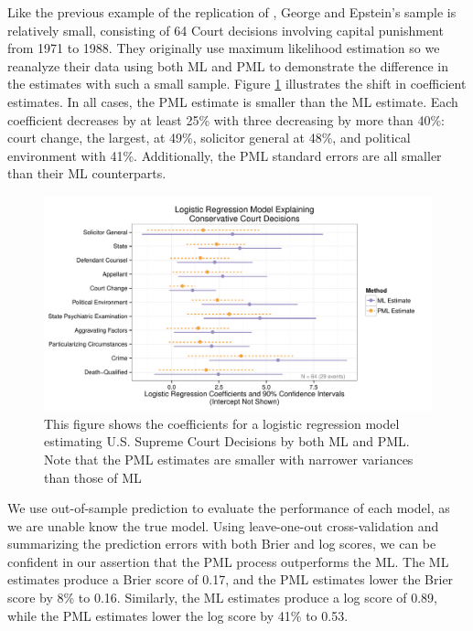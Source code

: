 \documentclass[12pt]{article}
\begin{document}
Like the previous example of the replication of \cite{Weisiger2014}, George and Epstein's sample is relatively small, consisting of 64 Court decisions involving capital punishment from 1971 to 1988. 
They originally use maximum likelihood estimation so we reanalyze their data using both ML and PML to demonstrate the difference in the estimates with such a small sample. 
Figure \ref{fig:ge-coefs} illustrates the shift in coefficient estimates. 
In all cases, the PML estimate is smaller than the ML estimate. 
Each coefficient decreases by at least 25\% with three decreasing by more than 40\%: court change, the largest, at 49\%, solicitor general at 48\%, and political environment with 41\%. 
Additionally, the PML standard errors are all smaller than their ML counterparts. 

\begin{figure}[H]
\begin{center}
\includegraphics[width = \textwidth]{figs/ge-coefs.pdf}
\caption{This figure shows the coefficients for a logistic regression model estimating U.S. Supreme Court Decisions by both ML and PML. Note that the PML estimates are smaller with narrower variances than those of ML}\label{fig:ge-coefs}
\end{center}
\end{figure}

We use out-of-sample prediction to evaluate the performance of each model, as we are unable know the true model. 
Using leave-one-out cross-validation and summarizing the prediction errors with both Brier and log scores, we can be confident in our assertion that the PML process outperforms the ML. 
The ML estimates produce a Brier score of 0.17, and the PML estimates lower the Brier score by 8\% to 0.16. 
Similarly, the ML estimates produce a log score of 0.89, while the PML estimates lower the log score by 41\% to 0.53. 
\end{document}
